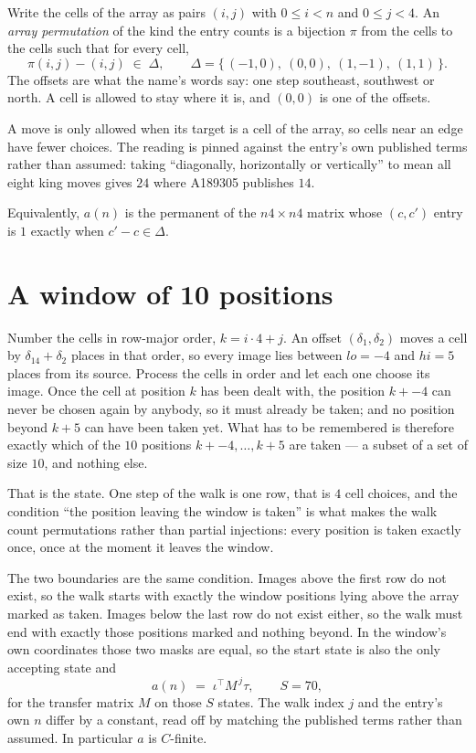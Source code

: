 \documentclass[11pt,a4paper]{article}
\theoremstyle{plain}
\theoremstyle{definition}
\begin{document}
Write the cells of the array as pairs $(i,j)$ with $0\le i<n$ and $0\le j<4$. An
\emph{array permutation} of the kind the entry counts is a bijection $\pi$ from the cells to
the cells such that for every cell,
\[
\pi(i,j)-(i,j)\;\in\;\Delta,\qquad
\Delta=\{\,(-1,0),\ (0,0),\ (1,-1),\ (1,1)\,\}.
\]
The offsets are what the name's words say: one step southeast, southwest or north. A cell is allowed to stay where it is, and $(0,0)$ is one of the offsets.

A move is only allowed when its target is a cell of the array, so cells near an
edge have fewer choices. The reading is pinned against the entry's own published terms rather
than assumed: taking ``diagonally, horizontally or vertically'' to mean all eight king moves
gives $24$ where A189305 publishes $14$.

Equivalently, $a(n)$ is the permanent of the $n4\times n4$ matrix whose $(c,c')$ entry is
$1$ exactly when $c'-c\in\Delta$.

\section{A window of 10 positions}

Number the cells in row-major order, $k=i\cdot4+j$. An offset $(\delta_1,\delta_2)$ moves a
cell by $\delta_14+\delta_2$ places in that order, so every image lies between $lo=-4$ and
$hi=5$ places from its source. Process the cells in order and let each one choose its image.
Once the cell at position $k$ has been dealt with, the position $k+-4$ can never be chosen
again by anybody, so it must already be taken; and no position beyond $k+5$ can have been
taken yet. What has to be remembered is therefore exactly which of the $10$ positions
$k+-4,\dots,k+5$ are taken --- a subset of a set of size $10$, and nothing else.

That is the state. One step of the walk is one row, that is $4$ cell choices, and the
condition ``the position leaving the window is taken'' is what makes the walk count permutations
rather than partial injections: every position is taken exactly once, once at the moment it
leaves the window.

The two boundaries are the same condition. Images above the first row do not exist, so the walk
starts with exactly the window positions lying above the array marked as taken. Images below the
last row do not exist either, so the walk must end with exactly those positions marked and
nothing beyond. In the window's own coordinates those two masks are equal, so the start state is
also the only accepting state and
\[
a(n)\;=\;\iota^{\!\top}M^{\,j}\tau ,\qquad S=70,
\]
for the transfer matrix $M$ on those $S$ states. The walk index $j$ and the entry's own $n$
differ by a constant, read off by matching the published terms rather than assumed. In
particular $a$ is $C$-finite.
\end{document}
